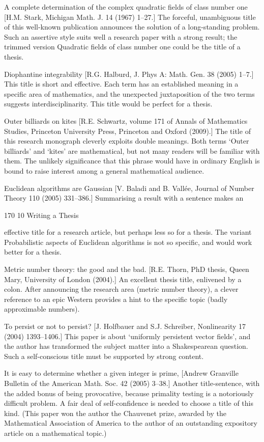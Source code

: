\documentclass[11pt]{article}
\theoremstyle{plain}
\theoremstyle{definition}
\begin{document}
A complete determination of the complex quadratic fields of class number one [H.M. Stark, Michigan Math. J. 14 (1967) 1--27.] The forceful, unambiguous title of this well-known publication announces the solution of a long-standing problem. Such an assertive style suits well a research paper with a strong result; the trimmed version Quadratic fields of class number one could be the title of a thesis.

Diophantine integrability [R.G. Halburd, J. Phys A: Math. Gen. 38 (2005) 1--7.] This title is short and effective. Each term has an established meaning in a specific area of mathematics, and the unexpected juxtaposition of the two terms suggests interdisciplinarity. This title would be perfect for a thesis.

Outer billiards on kites [R.E. Schwartz, volume 171 of Annals of Mathematics Studies, Princeton University Press, Princeton and Oxford (2009).] The title of this research monograph cleverly exploits double meanings. Both terms `Outer billiards' and `kites' are mathematical, but not many readers will be familiar with them. The unlikely significance that this phrase would have in ordinary English is bound to raise interest among a general mathematical audience.

Euclidean algorithms are Gaussian [V. Baladi and B. Vallée, Journal of Number Theory 110 (2005) 331--386.] Summarising a result with a sentence makes an

170 10 Writing a Thesis

effective title for a research article, but perhaps less so for a thesis. The variant Probabilistic aspects of Euclidean algorithms is not so specific, and would work better for a thesis.

Metric number theory: the good and the bad. [R.E. Thorn, PhD thesis, Queen Mary, University of London (2004).] An excellent thesis title, enlivened by a colon. After announcing the research area (metric number theory), a clever reference to an epic Western provides a hint to the specific topic (badly approximable numbers).

To persist or not to persist? [J. Holfbauer and S.J. Schreiber, Nonlinearity 17 (2004) 1393--1406.] This paper is about `uniformly persistent vector fields', and the author has transformed the subject matter into a Shakespearean question. Such a self-conscious title must be supported by strong content.

It is easy to determine whether a given integer is prime, [Andrew Granville Bulletin of the American Math. Soc. 42 (2005) 3--38.] Another title-sentence, with the added bonus of being provocative, because primality testing is a notoriously difficult problem. A fair deal of self-confidence is needed to choose a title of this kind. (This paper won the author the Chauvenet prize, awarded by the Mathematical Association of America to the author of an outstanding expository article on a mathematical topic.)
\end{document}
